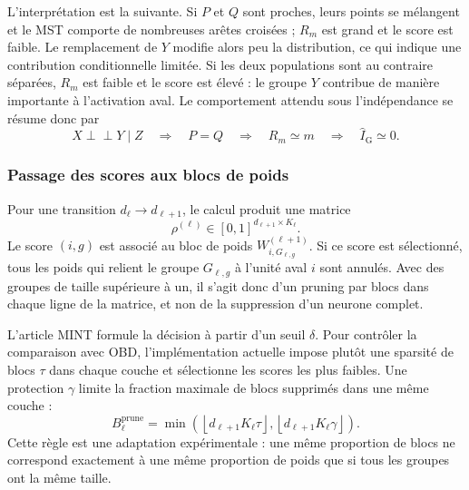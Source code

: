 L'interprétation est la suivante. Si $P$ et $Q$ sont proches, leurs points se
mélangent et le MST comporte de nombreuses arêtes croisées ; $R_m$ est grand et
le score est faible. Le remplacement de $Y$ modifie alors peu la distribution,
ce qui indique une contribution conditionnelle limitée. Si les deux
populations sont au contraire séparées, $R_m$ est faible et le score est élevé :
le groupe $Y$ contribue de manière importante à l'activation aval.
Le comportement attendu sous l'indépendance se résume donc par
\begin{equation}
    X\perp\!\!\!\perp Y\mid Z
    \quad\Longrightarrow\quad
    P=Q
    \quad\Longrightarrow\quad
    R_m\simeq m
    \quad\Longrightarrow\quad
    \widehat{I}_{\mathrm{G}}\simeq0.
\end{equation}

\subsubsection{Passage des scores aux blocs de poids}

Pour une transition $d_{\ell}\rightarrow d_{\ell+1}$, le calcul produit une
matrice
\begin{equation}
    \rho^{(\ell)}
    \in[0,1]^{d_{\ell+1}\times K_{\ell}}.
\end{equation}
Le score $(i,g)$ est associé au bloc de poids
$W^{(\ell+1)}_{i,G_{\ell,g}}$. Si ce score est sélectionné, tous les poids qui
relient le groupe $G_{\ell,g}$ à l'unité aval $i$ sont annulés. Avec des groupes
de taille supérieure à un, il s'agit donc d'un pruning par blocs dans chaque
ligne de la matrice, et non de la suppression d'un neurone complet.

L'article MINT formule la décision à partir d'un seuil $\delta$. Pour contrôler
la comparaison avec OBD, l'implémentation actuelle impose plutôt une sparsité
de blocs $\tau$ dans chaque couche et sélectionne les scores les plus faibles.
Une protection $\gamma$ limite la fraction maximale de blocs supprimés dans une
même couche :
\begin{equation}
    B_{\ell}^{\mathrm{prune}}
    =\min\!\left(
        \left\lfloor d_{\ell+1}K_{\ell}\tau\right\rfloor,
        \left\lfloor d_{\ell+1}K_{\ell}\gamma\right\rfloor
      \right).
    \label{eq:blocs_prunes_mint}
\end{equation}
Cette règle est une adaptation expérimentale : une même proportion de blocs
ne correspond exactement à une même proportion de poids que si tous les groupes
ont la même taille.

